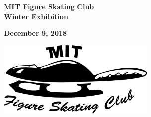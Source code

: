 \documentclass[12pt]{article}
\newcommand{\programnumber}[2]{{
  \vspace{0.1in}
  \textbf{#1}\\
  {\footnotesize #2}
}}
\begin{document}
\begin{multicols*}{2}
\begin{center}
\vspace*{1.5in}

{\Large \textbf{MIT Figure Skating Club}}\\
{\Large \textbf{Winter Exhibition}}

\vspace{0.2in}

{\large\textbf{December 9, 2018}}

\vspace{0.7in}

\includegraphics[width=3in]{fsclogo.png}

\end{center}

\vfill\null
\columnbreak


\vfill\null
\columnbreak

\begin{center}



\end{center}
\end{multicols*}
\end{document}
